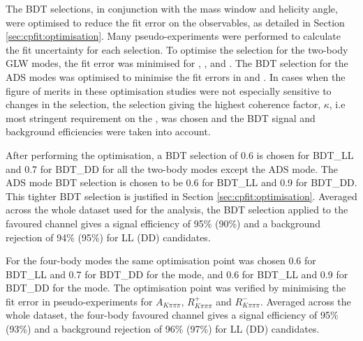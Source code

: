 The BDT selections, in conjunction with the \Kstarm mass window and \KS helicity angle, were optimised to reduce the fit error on the \CP observables, as detailed in Section \ref{sec:cpfit:optimisation}. Many pseudo-experiments were performed to calculate the fit uncertainty for each selection. To optimise the selection for the two-body GLW modes, the fit error was minimised for \Akk, \Rkk, \Apipi and \Rpipi. The BDT selection for the ADS modes was optimised to minimise the fit errors in \Rptwo and \Rmtwo. In cases when the figure of merits in these optimisation studies were not especially sensitive to changes in the selection, the selection giving the highest coherence factor, $\kappa$, i.e most stringent requirement on the \Kstarm, was chosen and the BDT signal and background efficiencies were taken into account.

After performing the optimisation, a BDT selection of 0.6 is chosen for BDT\_LL and 0.7 for BDT\_DD for all the two-body \D modes except the ADS mode. The ADS mode BDT selection is chosen to be 0.6 for BDT\_LL and 0.9 for BDT\_DD. This tighter BDT selection is justified in Section \ref{sec:cpfit:optimisation}. Averaged across the whole dataset used for the analysis, the BDT selection applied to the favoured \kpi channel gives a signal efficiency of 95\% (90\%) and a background rejection of 94\% (95\%) for LL (DD) candidates. 

For the four-body modes the same optimisation point was chosen 0.6 for BDT\_LL and 0.7 for BDT\_DD for the \decay{\Dz}{\Kp\pim\pip\pim} \decay{\Dz}{\pi\pi\pi\pi} mode, and 0.6 for BDT\_LL and 0.9 for BDT\_DD for the \decay{\Dz}{\Kp\pim\pip\pim} mode. The optimisation point was verified by minimising the fit error in pseudo-experiments for $A_{K\pi\pi\pi}$, $R^+_{K\pi\pi\pi}$ and $R^-_{K\pi\pi\pi}$. Averaged across the whole dataset, the four-body favoured \kpipipi channel gives a signal efficiency of 95\% (93\%) and a background rejection of 96\% (97\%) for LL (DD) candidates.



